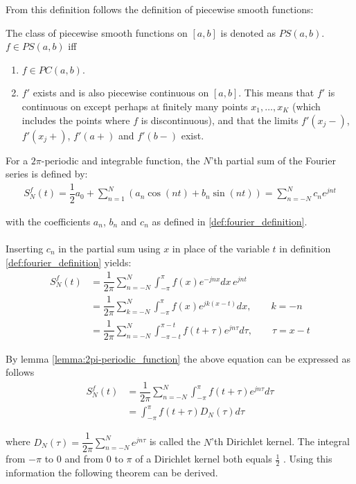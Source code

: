 From this definition follows the definition of piecewise smooth functions:
\begin{definition}
The class of piecewise smooth functions on $[a,b]$ is denoted as $PS(a,b)$. $f\in PS(a,b)$ iff
\begin{enumerate}
	\item $f \in PC(a,b)$.
	\item $f'$ exists and is also piecewise continuous on $[a,b]$. This means that $f'$ is continuous on except perhaps at finitely many points $x_1, \dots, x_K$ (which includes the points where $f$ is discontinuous), and that the limits $f'(x_j-)$, $f'(x_j+)$, $f'(a+)$ and $f'(b-)$ exist.
\end{enumerate}
\end{definition}

For a $2\pi$-periodic and integrable function, the $N$'th partial sum of the Fourier series is defined by:
\begin{align}\label{eq:partialsumFourierSeries}
	S_N^f(t) = \dfrac{1}{2} a_0 + \sum_{n=1}^N\left(a_n \cos(n t) + b_n \sin(n t) \right) = \sum_{n=-N}^N c_n e^{j n t}
\end{align}

with the coefficients $a_n$, $b_n$ and $c_n$ as defined in \ref{def:fourier_definition}.
\\ \\
Inserting $c_n$ in the partial sum using $x$ in place of the variable $t$ in definition \ref{def:fourier_definition} yields:
\begin{align*}
	S_N^f(t)
	&= \dfrac{1}{2\pi}\sum_{n=-N}^N \int_{-\pi}^\pi f(x) e^{-j 		n x} dx\, e^{j n t} \\
	&= \dfrac{1}{2\pi}\sum_{k = -N}^N \int_{-\pi}^\pi f(x) e^{		j k (x-t)} dx, \quad \quad k = -n \\
	&= \dfrac{1}{2\pi} \sum_{n = -N}^N \int_{-\pi - t}^{\pi - 		t} f(t + \tau ) e^{j n \tau} d\tau, \quad \quad \tau = x-t
\end{align*}

By lemma \ref{lemma:2pi-periodic_function} the above equation can be expressed as follows
\begin{align*}
	S_N^f (t) 
	&= \dfrac{1}{2\pi} \sum_{n=-N}^N \int_{-\pi}^\pi f(t + \tau) e^{j n \tau} d\tau\\
	&= \int_{-\pi}^\pi f(t + \tau) D_N(\tau) d\tau
\end{align*}

where $D_N(\tau) = \dfrac{1}{2\pi}\sum_{n=-N}^{N}e^{j n \tau}$ is called the $N$'th Dirichlet kernel. The integral from $-\pi$ to $0$ and from $0$ to $\pi$ of a Dirichlet kernel both equals $\frac{1}{2}$ \cite{page 34-35, FAA}. Using this information the following theorem can be derived.

